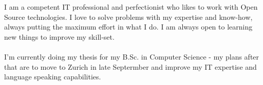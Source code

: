 I am a competent IT professional and perfectionist who likes to work with Open Source technologies.
I love to solve problems with my expertise and know-how, always putting the maximum effort in what I do.
I am always open to learning new things to improve my skill-set.\\
\\
I'm currently doing my thesis for my B.Sc. in Computer Science - my plans after that are
to move to Zurich in late Septermber and improve my IT expertise and language speaking capabilities.